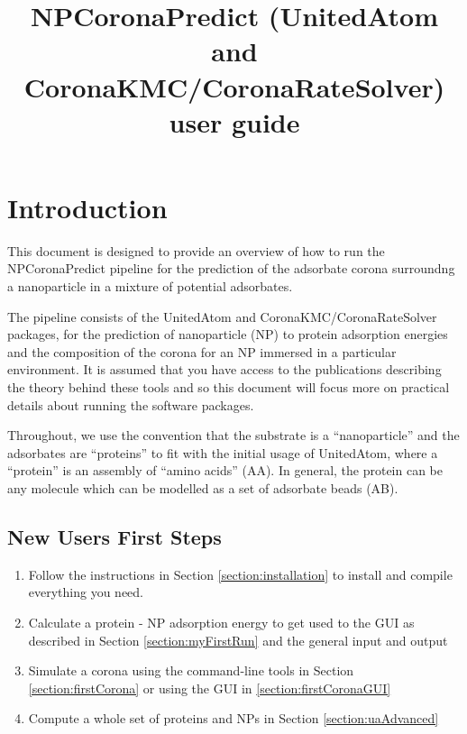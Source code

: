 \documentclass[10pt,a4paper,onecolumn]{report}
\begin{document}
\title{NPCoronaPredict (UnitedAtom and CoronaKMC/CoronaRateSolver) user guide}

\maketitle 

\tableofcontents

\chapter{Introduction}
This document is designed to provide an overview of how to run the NPCoronaPredict pipeline for the prediction of the adsorbate corona surroundng a nanoparticle in a mixture of potential adsorbates.

The pipeline consists of the UnitedAtom and CoronaKMC/CoronaRateSolver packages, for the prediction of nanoparticle (NP) to protein adsorption energies and the composition of the corona for an NP immersed in a particular environment. It is assumed that you have access to the publications describing the theory behind these tools and so this document will focus more on practical details about running the software packages.

Throughout, we use the convention that the substrate is a ``nanoparticle'' and the adsorbates are ``proteins'' to fit with the initial usage of UnitedAtom, where a ``protein'' is an assembly of ``amino acids'' (AA). In general, the protein can be any molecule which can be modelled as a set of adsorbate beads (AB).

\section{New Users First Steps}
\begin{enumerate}
\item Follow the instructions in Section \ref{section:installation} to install and compile everything you need.
\item Calculate a protein - NP adsorption energy to get used to the GUI as described in Section \ref{section:myFirstRun} and the general input and output
\item Simulate a corona using the command-line tools in Section \ref{section:firstCorona} or using the GUI in \ref{section:firstCoronaGUI}
\item Compute a whole set of proteins and NPs in Section \ref{section:uaAdvanced}
\end{enumerate}
\end{document}

